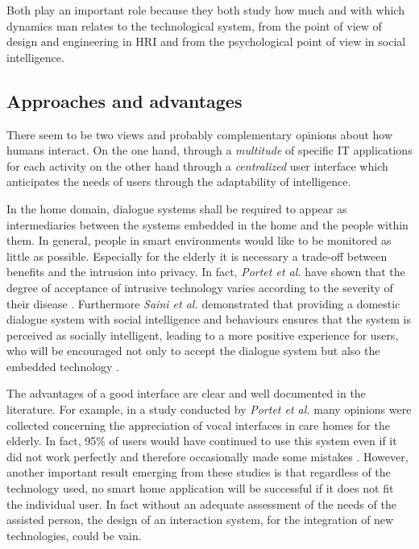 \documentclass{thesisreport}
\begin{document}
 Both play an important role because they both study how much and with which dynamics man relates to the technological system, from the point of view of design and engineering in HRI and from the psychological point of view in social intelligence.

 \subsection{Approaches and advantages}

There seem to be two views and probably complementary opinions about how humans interact. On the one hand, through a \emph{multitude} of specific IT applications for each activity on the other hand through a \emph{centralized} user interface which anticipates the needs of users through the adaptability of intelligence.

 In the home domain, dialogue systems shall be required to appear as intermediaries between the systems embedded in the home and the people within them.
 In general, people in smart environments would like to be monitored as little as possible. Especially for the elderly it is necessary a trade-off between benefits and the intrusion into privacy. In fact, \textit{Portet et al.} have shown that the degree of acceptance of intrusive technology varies according to the severity of their disease \cite{portet2013design}. 
 Furthermore \textit{Saini et al.} demonstrated that providing a domestic dialogue system with social intelligence and behaviours ensures that the system is perceived as socially intelligent, leading to a more positive experience for users, who will be encouraged not only to accept the dialogue system but also the embedded technology \cite{saini2005benefits}.
 
 The advantages of a good interface are clear and well documented in the literature.
 For example, in a study conducted by \textit{Portet et al.} many opinions were collected concerning the appreciation of vocal interfaces in care homes for the elderly. In fact, 95\% of users would have continued to use this system even if it did not work perfectly and therefore occasionally made some mistakes \cite{portet2013design}.
 However, another important result emerging from these studies is that regardless of the technology used, no smart home application will be successful if it does not fit the individual user.
 In fact without an adequate assessment of the needs of the assisted person, the design of an interaction system, for the integration of new technologies, could be vain.
 
\end{document}
